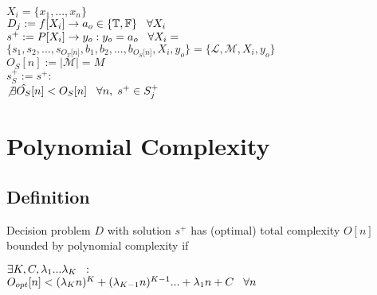 \documentclass[11pt]{article}
\begin{document}
\begin{center}
$
X_i = \{x_1,...,x_n\}
$
\\ \vspace{2mm}
$
D_j := f \lbrack X_i \rbrack \rightarrow a_{o} \in \{\mathbb{T}, \mathbb{F}\} \hspace{3mm} \forall X_i
$
\\ \vspace{2mm}
$
s^+ := P \lbrack X_i \rbrack \rightarrow y_{o} : y_o = a_{o} \hspace{3mm} \forall X_i = 
$
\\ \vspace{2mm}
$
\{ s_1,s_2,...,s_{O_T \lbrack n \rbrack }, b_1, b_2,...,b_{O_S \lbrack n \rbrack},X_i,y_o \} = \{ \mathcal{L},\mathcal{M},X_i,y_o\}
$
\\ \vspace{3mm}
$
O_S[n] := |\mathcal{M}| = M
$
\\ \vspace{2mm}
$
s_{S}^+ := s^+ :
$
\\ \vspace{2mm}
$
\not \exists \hat{O_S} \lbrack n \rbrack < O_{S}[n] \hspace{3mm} \forall n, \hspace{1mm}  s^+ \in S_j^+
$
\end{center}






















\newpage
\section{Polynomial Complexity}

\subsection{Definition}
Decision problem $D$ with solution $s^+$ has (optimal) total complexity $O[n]$ bounded by polynomial complexity if
\begin{center}
$\exists K,C,\lambda_1...\lambda_K \hspace{2mm} :$
\\ \vspace{2mm}
$O_{opt}[n] < (\lambda_K n)^K + (\lambda_{K-1} n)^{K-1}... + \lambda_1 n + C \hspace{3mm} \forall n$
\end{center}
\end{document}
